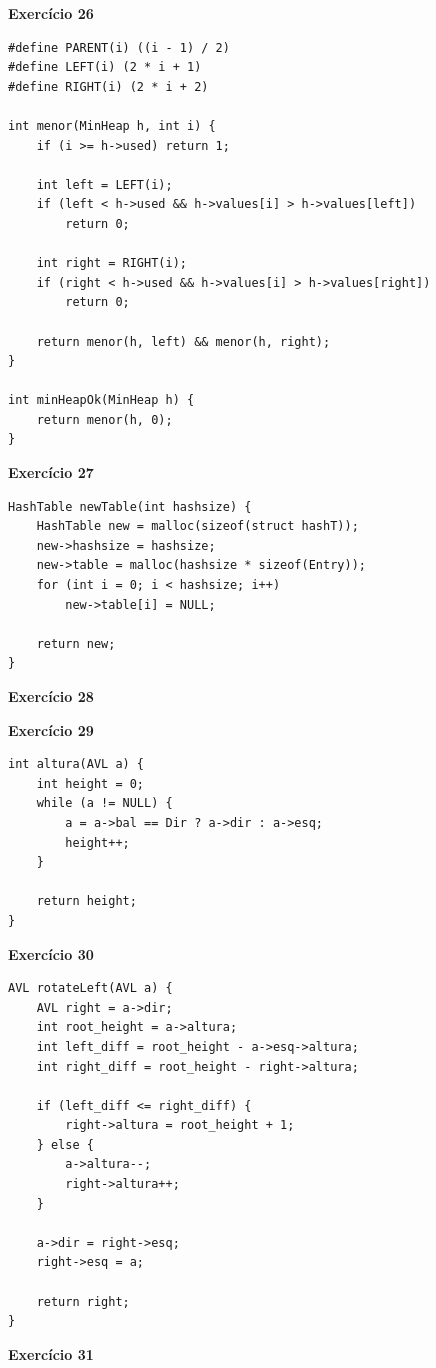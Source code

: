 \documentclass[a4paper,11pt]{article}
\begin{document}
\noindent \textbf{Exercício 26}

\begin{verbatim}
#define PARENT(i) ((i - 1) / 2)
#define LEFT(i) (2 * i + 1)
#define RIGHT(i) (2 * i + 2)

int menor(MinHeap h, int i) {
	if (i >= h->used) return 1;
	
	int left = LEFT(i);
	if (left < h->used && h->values[i] > h->values[left])
		return 0;
	
	int right = RIGHT(i);
	if (right < h->used && h->values[i] > h->values[right])
		return 0;
	
	return menor(h, left) && menor(h, right);
}

int minHeapOk(MinHeap h) {
	return menor(h, 0);
}
\end{verbatim}

\noindent \textbf{Exercício 27}

\begin{verbatim}
HashTable newTable(int hashsize) {
	HashTable new = malloc(sizeof(struct hashT));
	new->hashsize = hashsize;
	new->table = malloc(hashsize * sizeof(Entry));
	for (int i = 0; i < hashsize; i++)
		new->table[i] = NULL;
	
	return new;
}
\end{verbatim}

\noindent \textbf{Exercício 28}



\noindent \textbf{Exercício 29}

\begin{verbatim}
int altura(AVL a) {
	int height = 0;
	while (a != NULL) {
		a = a->bal == Dir ? a->dir : a->esq;
		height++;
	}
	
	return height;
}
\end{verbatim}

\noindent \textbf{Exercício 30}

\begin{verbatim}
AVL rotateLeft(AVL a) {
	AVL right = a->dir;
	int root_height = a->altura;
	int left_diff = root_height - a->esq->altura;
	int right_diff = root_height - right->altura;
	
	if (left_diff <= right_diff) {
		right->altura = root_height + 1;
	} else {
		a->altura--;
		right->altura++;
	}
	
	a->dir = right->esq;
	right->esq = a;
	
	return right;
}
\end{verbatim}

\noindent \textbf{Exercício 31}
\end{document}
